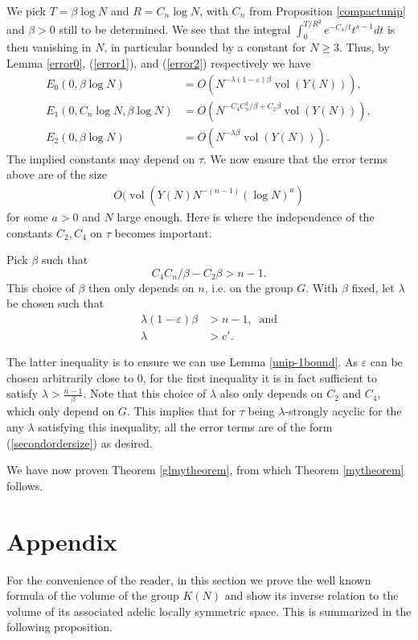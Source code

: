 \documentclass[11pt,reqno]{amsart}
\numberwithin{equation}{section}
\theoremstyle{definition}
\theoremstyle{remark}
\newcommand{\vol}{\operatorname{vol}}
\renewcommand{\epsilon}{\varepsilon}
\begin{document}
We pick $T=\beta \log N$ and $R=C_n\log N$, with $C_n$ from Proposition \ref{compactunip} and $\beta>0$ still to be determined. We see that the integral $\int_0^{T/R^2}e^{-C_4/t}t^{s-1}dt$ is then vanishing in $N$, in particular bounded by a constant for $N\geq 3$. Thus, by Lemma \ref{error0}, (\ref{error1}), and (\ref{error2}) respectively we have
\begin{align*}
    E_0(0,\beta\log N) &= O( N^{-\lambda(1-\epsilon)\beta}\vol(Y(N))),\\
    E_1(0,C_n \log N,\beta\log N) &= O( N^{-C_4C_n^2/\beta +C_2\beta}\vol(Y(N))),\\
    E_2(0,\beta\log N) &= O( N^{-\lambda\beta}\vol(Y(N))).
\end{align*}
The implied constants may depend on $\tau$. We now ensure that the error terms above are of the size
\begin{align}\label{secondordersize}
    O(\vol(Y(N)N^{-(n-1)}(\log N)^a)
\end{align}
for some $a>0$ and $N$ large enough. Here is where the independence of the constants $C_2,C_4$ on $\tau$ becomes important. 

Pick $\beta$ such that 
$$C_4C_n/\beta-C_2\beta>n-1.$$
This choice of $\beta$ then only depends on $n$, i.e. on the group $G$. With $\beta$ fixed, let $\lambda$ be chosen such that 
\begin{align*}
    \lambda(1-\epsilon)\beta&>n-1, \:\text{ and}\\
    \lambda &> c'.
\end{align*}

\noindent The latter inequality is to ensure we can use Lemma \ref{unip-1bound}. As $\epsilon$ can be chosen arbitrarily close to $0$, for the first inequality it is in fact sufficient to satisfy $\lambda>\frac{n-1}{\beta}$. Note that this choice of $\lambda$ also only depends on $C_2$ and $C_4$, which only depend on $G$. This implies that for $\tau$ being $\lambda$-strongly acyclic for the any $\lambda$ satisfying this inequality, all the error terms are of the form (\ref{secondordersize}) as desired.

We have now proven Theorem \ref{glmytheorem}, from which Theorem \ref{mytheorem} follows.

\clearpage
\bigskip

\pagebreak

\section{Appendix}
\noindent For the convenience of the reader, in this section we prove the well known formula of the volume of the group $K(N)$ and show its inverse relation to the volume of its associated adelic locally symmetric space. This is summarized in the following proposition.
\end{document}
